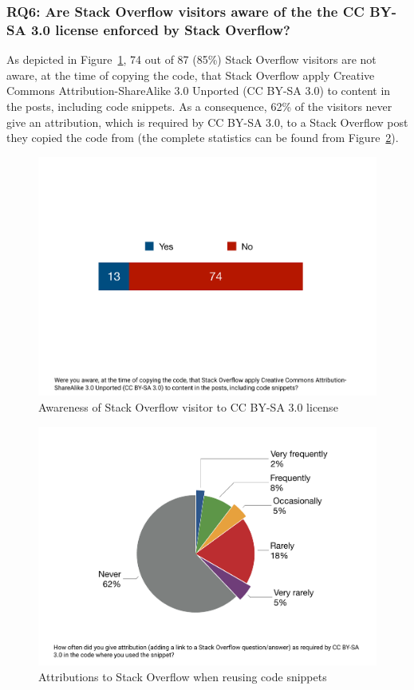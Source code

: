 \documentclass{svjour3}                     %
\begin{document}
\subsubsection*{RQ6: Are Stack Overflow visitors aware of the the CC BY-SA 3.0
	license enforced by Stack Overflow?}

As depicted in Figure~\ref{fig:survey_visitor_cc_by-sa}, 74 out of 87 (85\%)
Stack Overflow visitors are not aware, at the time of copying the code, that
Stack Overflow apply Creative Commons Attribution-ShareAlike 3.0 Unported (CC
BY-SA 3.0) to content in the posts, including code snippets. As a consequence,
62\% of the visitors never give an attribution, which is required by CC BY-SA
3.0, to a Stack Overflow post they copied the code from (the complete statistics
can be found from Figure~\ref{fig:survey_visitor_attribution-sa}).

\begin{figure} \centering
	\includegraphics[width=.4\linewidth]{survey_visitor_cc_by_sa} 
	\caption{Awareness of Stack Overflow visitor to CC BY-SA 3.0 license}
	\label{fig:survey_visitor_cc_by-sa} 
\end{figure}

\begin{figure} \centering
	\includegraphics[width=.4\linewidth]{survey_visitor_attribution} 
	\caption{Attributions to Stack Overflow when reusing code snippets}
	\label{fig:survey_visitor_attribution-sa} 
\end{figure}

\vspace{0.5cm} \noindent{} \vspace{0.5cm}
\end{document}
